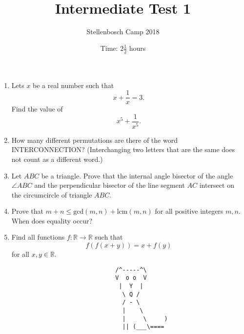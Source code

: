 \documentclass{article}
\title{Intermediate Test 1}
\author{Stellenbosch Camp 2018}
\date{Time: $2\frac{1}{2}$ hours}
\begin{document}
\maketitle

\begin{enumerate}[1.]

\item %
Lets $x$ be a real number such that \[ x +\frac{1}{x} = 3. \] Find the value of \[ x^5 +\frac{1}{x^5}. \]

\vspace{12pt}
\item %
How many different permutations are there of the word INTERCONNECTION? (Interchanging two letters that are the same does not count as a different word.)

\vspace{12pt}
\item %
Let $ABC$ be a triangle. Prove that the internal angle bisector of the angle $\angle ABC$ and the perpendicular bisector of the line segment $AC$ intersect on the circumcircle of triangle $ABC$.

\vspace{12pt}
\item %
Prove that $m + n \leq \textrm{gcd}(m, n) + \textrm{lcm}(m, n)$ for all positive integers $m, n$. When does equality occur?

\vspace{12pt}
\item %
Find all functions $f : \mathbb{R} \to \mathbb{R}$ such that
$$ f(f(x+y)) = x + f(y) $$
for all $x, y \in \mathbb{R}$.

\end{enumerate}


\begin{center}
\begin{verbatim}
                                 /^-----^\
                                 V  o o  V
                                  |  Y  |
                                   \ Q /
                                   / - \
                                   |    \
                                   |     \     )
                                   || (___\====
\end{verbatim}
\end{center}
\end{document}
